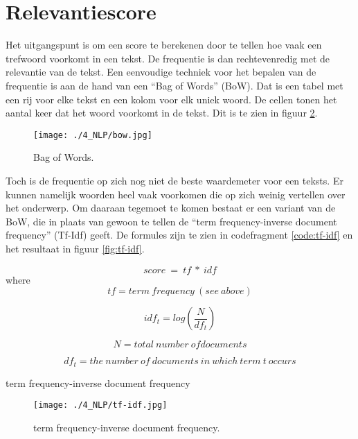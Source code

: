 \section{Relevantiescore}
Het uitgangspunt is om een score te berekenen door te tellen hoe vaak een trefwoord voorkomt in een tekst. De frequentie is dan rechtevenredig met de relevantie van de tekst. Een eenvoudige techniek voor het bepalen van de frequentie is aan de hand van een ``Bag of Words'' (BoW). Dat is een tabel met een rij voor elke tekst en een kolom voor elk uniek woord. De cellen tonen het aantal keer dat het woord voorkomt in de tekst.  Dit is te zien in figuur \ref{fig:bow}.
\begin{figure}
    \centering
    \texttt{[image: ./4\_NLP/bow.jpg]}
    \caption[Bag of Words.]{\label{fig:bow}Bag of Words.}
\end{figure}
Toch is de frequentie op zich nog niet de beste waardemeter voor een teksts. Er kunnen namelijk woorden heel vaak voorkomen die op zich weinig vertellen over het onderwerp. Om daaraan tegemoet te komen bestaat er een variant van de BoW, die in plaats van gewoon te tellen de ``term frequency-inverse document frequency'' (Tf-Idf) geeft. De formules zijn te zien in codefragment \ref{code:tf-idf} en het resultaat in figuur \ref{fig:tf-idf}.
\begin{listing}
    \begin{equation}
        score\ =\ tf\ \ast\ idf
    \end{equation}  
    where
    \begin{equation}
        tf=term\ frequency\ \left(see\ above\right)
    \end{equation} 
    
    \begin{equation}
        idf_t=log\left(\frac{N}{df_t}\right)
    \end{equation}  
    
    \begin{equation} 
        N=total\ number\ ofdocuments
    \end{equation}  
    
    \begin{equation} 
        df_t=the\ number\ of\ documents\ in\ which\ term\ t\ occurs
    \end{equation}  
    \caption[term frequency-inverse document frequency]{term frequency-inverse document frequency}
    \label{code:tf-idf}
\end{listing}
\begin{figure}
    \centering
    \texttt{[image: ./4\_NLP/tf-idf.jpg]}
    \caption[term frequency-inverse document frequency.]{\label{fig:bow}term frequency-inverse document frequency.}
\end{figure}
